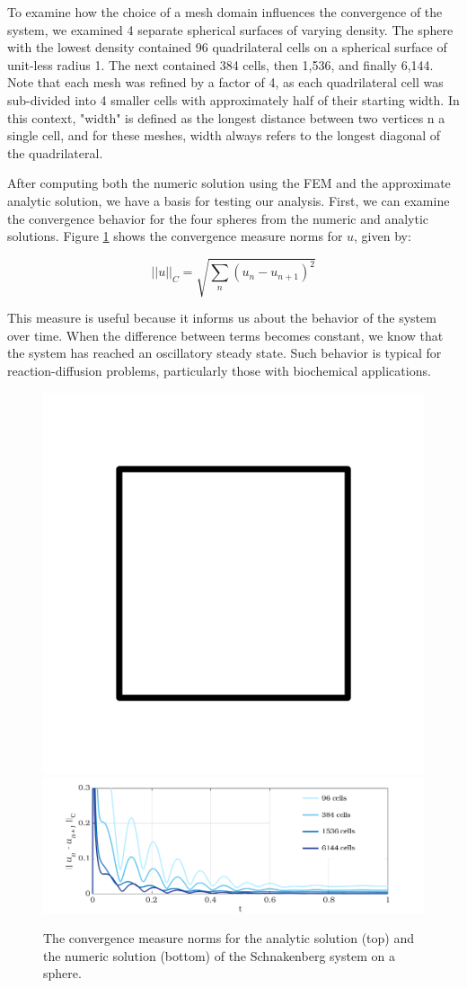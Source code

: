 \documentclass[12pt]{article}
\begin{document}
To examine how the choice of a mesh domain influences the convergence of the system, we examined 4 separate spherical surfaces of varying density. The sphere with the lowest density contained 96 quadrilateral cells on a spherical surface of unit-less radius 1. The next contained 384 cells, then 1,536, and finally 6,144. Note that each mesh was refined by a factor of 4, as each quadrilateral cell was sub-divided into 4 smaller cells with approximately half of their starting width. In this context, "width" is defined as the longest distance between two vertices n a single cell, and for these meshes, width always refers to the longest diagonal of the quadrilateral. 

After computing both the numeric solution using the FEM and the approximate analytic solution, we have a basis for testing our analysis. First, we can examine the convergence behavior for the four spheres from the numeric and analytic solutions. Figure \ref{fig:inner_norms} shows the convergence measure norms for $u$, given by:

$$ ||u||_C = \sqrt{\sum_n (u_{n} - u_{n+1})^2} $$

This measure is useful because it informs us about the behavior of the system over time. When the difference between terms becomes constant, we know that the system has reached an oscillatory steady state. Such behavior is typical for reaction-diffusion problems, particularly those with biochemical applications. 

\begin{figure}[H]
	\includegraphics[width=.5\linewidth]{xxx.png}\\
	\includegraphics[width=\linewidth, trim= 1.4cm 0 2cm 0, clip]{norm_numeric.png}
	\caption{The convergence measure norms for the analytic solution (top) and the numeric solution (bottom) of the Schnakenberg system on a sphere.}
	\label{fig:inner_norms}
\end{figure}
\end{document}
